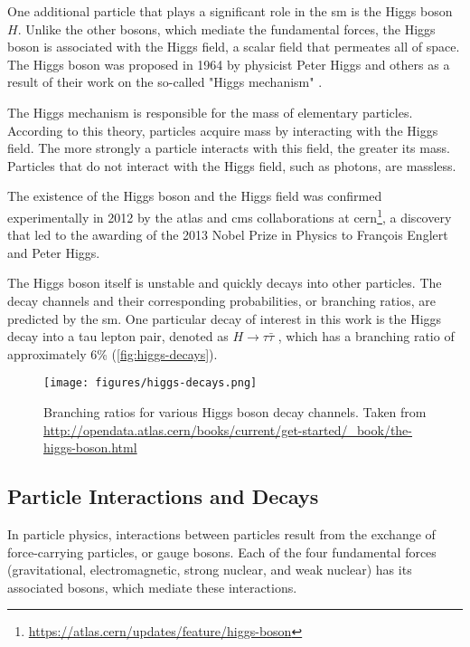 One additional particle that plays a significant role in the \gls{sm} is the Higgs boson $H$. Unlike the other bosons,
which mediate the fundamental forces, the Higgs boson is associated with the Higgs field, a scalar field that permeates
all of space. The Higgs boson was proposed in 1964 by physicist Peter Higgs and others as a result of their work on the
so-called "Higgs mechanism" \cite{higgs}.

The Higgs mechanism is responsible for the mass of elementary particles. According to this theory, particles acquire
mass by interacting with the Higgs field. The more strongly a particle interacts with this field, the greater its mass.
Particles that do not interact with the Higgs field, such as photons, are massless.

The existence of the Higgs boson and the Higgs field was confirmed experimentally in 2012 by the \gls{atlas} and \gls{cms}
collaborations at \gls{cern}\footnote{\url{https://atlas.cern/updates/feature/higgs-boson}}, a discovery that led to the
awarding of the 2013 Nobel Prize in Physics to François Englert and Peter Higgs.

The Higgs boson itself is unstable and quickly decays into other particles. The decay channels and their corresponding
probabilities, or branching ratios, are predicted by the \gls{sm}. One particular decay of interest in
this work is the Higgs decay into a tau lepton pair, denoted as $H \rightarrow \tau\bar{\tau}$ , which has a branching
ratio of approximately 6\% (\autoref{fig:higgs-decays}).

\begin{figure}[htb]
    \centering
    \texttt{[image: figures/higgs-decays.png]}
    \caption[Branching ratios for various Higgs boson decay channels]
    {Branching ratios for various Higgs boson decay channels. Taken from
        \url{http://opendata.atlas.cern/books/current/get-started/_book/the-higgs-boson.html}}
    \label{fig:higgs-decays}
\end{figure}



\subsection{Particle Interactions and Decays}

In particle physics, interactions between particles result from the exchange of force-carrying particles, or gauge
bosons. Each of the four fundamental forces (gravitational, electromagnetic, strong nuclear, and weak nuclear) has its
associated bosons, which mediate these interactions.

